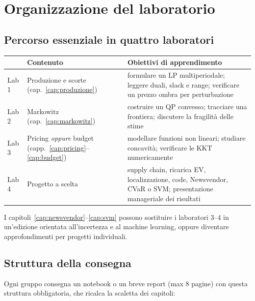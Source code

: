 \chapter{Organizzazione del laboratorio}
\label{cap:organizzazione}

\section{Percorso essenziale in quattro laboratori}

\begin{center}\small
\begin{tabular}{lp{5.2cm}p{6.6cm}}
\toprule
 & Contenuto & Obiettivi di apprendimento \\
\midrule
Lab 1 & Produzione e scorte (cap.~\ref{cap:produzione}) &
formulare un LP multiperiodale; leggere duali, slack e range; verificare un prezzo
ombra per perturbazione \\
Lab 2 & Markowitz (cap.~\ref{cap:markowitz}) &
costruire un QP convesso; tracciare una frontiera; discutere la fragilità delle stime \\
Lab 3 & Pricing \emph{oppure} budget (capp.~\ref{cap:pricing}--\ref{cap:budget}) &
modellare funzioni non lineari; studiare concavità; verificare le KKT numericamente \\
Lab 4 & Progetto a scelta &
supply chain, ricarica EV, localizzazione, code, Newsvendor, CVaR o SVM; presentazione
manageriale dei risultati \\
\bottomrule
\end{tabular}
\end{center}

I capitoli~\ref{cap:newsvendor}--\ref{cap:svm} possono sostituire i laboratori 3--4 in
un'edizione orientata all'incertezza e al machine learning, oppure diventare
approfondimenti per progetti individuali.

\section{Struttura della consegna}

Ogni gruppo consegna un notebook o un breve report (max 8 pagine) con questa
struttura obbligatoria, che ricalca la scaletta dei capitoli:

